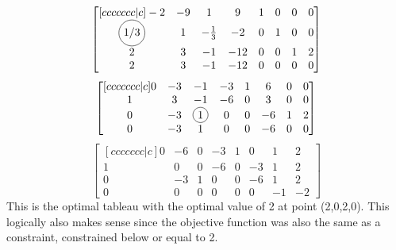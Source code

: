 \documentclass[12pt]{article}
\newcommand*\circled[1]{\tikz[baseline=(char.base)]{
		\node[shape=circle,draw,inner sep=2pt] (char) {#1};}}
\newenvironment{exercise}[2][Exercise]{\begin{trivlist}
		\item[\hskip \labelsep {\bfseries #1}\hskip \labelsep {\bfseries #2.}]}{\end{trivlist}}
\begin{document}
\begin{exercise}{4}
\[\begin{bmatrix}[ccccccc|c]
	-2   	      & -9 &     1        &   9 & 1 & 0 &  0 & 0\\
	\circled{1/3} &  1 & -\frac{1}{3} &  -2 & 0 & 1 &  0 & 0\\
	2     		  &  3 &    -1        & -12 & 0 & 0 &  1 & 2\\
	2      		  &  3 &    -1        & -12 & 0 & 0 &  0 & 0
\end{bmatrix}\]
\[\begin{bmatrix}[ccccccc|c]
	0 & -3 & -1 & -3 & 1 &  6 &  0 & 0\\
	1 &  3 & -1 & -6 & 0 &  3 &  0 & 0\\
	0 & -3 &  \circled{1} &  0 & 0 & -6 &  1 & 2\\
	0 & -3 &  1 &  0 & 0 & -6 &  0 & 0
\end{bmatrix}\]
\[\begin{bmatrix}[ccccccc|c]
	0 & -6 & 0 & -3 & 1 &  0 &  1 & 2\\
	1 &  0 & 0 & -6 & 0 & -3 &  1 & 2\\
	0 & -3 & 1 &  0 & 0 & -6 &  1 & 2\\
	0 &  0 & 0 &  0 & 0 &  0 & -1 & -2
\end{bmatrix}\]
This is the optimal tableau with the optimal value of 2 at point (2,0,2,0). This logically also makes sense since the objective function was also the same as a constraint, constrained below or equal to 2.
\end{exercise}
 
\end{document}
